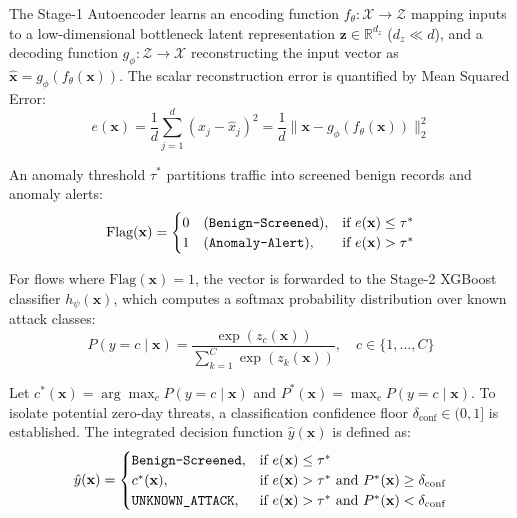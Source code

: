 \documentclass[12pt,a4paper]{report}
\begin{document}
The Stage-1 Autoencoder learns an encoding function $f_\theta: \mathcal{X} \to \mathcal{Z}$ mapping inputs to a low-dimensional bottleneck latent representation $\mathbf{z} \in \mathbb{R}^{d_z}$ ($d_z \ll d$), and a decoding function $g_\phi: \mathcal{Z} \to \mathcal{X}$ reconstructing the input vector as $\hat{\mathbf{x}} = g_\phi(f_\theta(\mathbf{x}))$. The scalar reconstruction error is quantified by Mean Squared Error:
\begin{equation}
e(\mathbf{x}) = \frac{1}{d}\sum_{j=1}^d \left(x_j - \hat{x}_j\right)^2 = \frac{1}{d}\|\mathbf{x} - g_\phi(f_\theta(\mathbf{x}))\|_2^2
\label{eq:ch3_re}
\end{equation}

An anomaly threshold $\tau^*$ partitions traffic into screened benign records and anomaly alerts:
\begin{equation}
\text{Flag}(\mathbf{x}) = \begin{cases}
0 \quad (\text{\texttt{Benign-Screened}}), & \text{if } e(\mathbf{x}) \le \tau^* \\
1 \quad (\text{\texttt{Anomaly-Alert}}), & \text{if } e(\mathbf{x}) > \tau^*
\end{cases}
\label{eq:ch3_gate}
\end{equation}

For flows where $\text{Flag}(\mathbf{x}) = 1$, the vector is forwarded to the Stage-2 XGBoost classifier $h_\psi(\mathbf{x})$, which computes a softmax probability distribution over known attack classes:
\begin{equation}
P(y = c \mid \mathbf{x}) = \frac{\exp(z_c(\mathbf{x}))}{\sum_{k=1}^C \exp(z_k(\mathbf{x}))}, \quad c \in \{1, \dots, C\}
\label{eq:ch3_softmax}
\end{equation}

Let $c^*(\mathbf{x}) = \arg\max_{c} P(y = c \mid \mathbf{x})$ and $P^*(\mathbf{x}) = \max_{c} P(y = c \mid \mathbf{x})$. To isolate potential zero-day threats, a classification confidence floor $\delta_{\text{conf}} \in (0, 1]$ is established. The integrated decision function $\hat{y}(\mathbf{x})$ is defined as:
\begin{equation}
\hat{y}(\mathbf{x}) = \begin{cases}
\text{\texttt{Benign-Screened}}, & \text{if } e(\mathbf{x}) \le \tau^* \\
c^*(\mathbf{x}), & \text{if } e(\mathbf{x}) > \tau^* \text{ and } P^*(\mathbf{x}) \ge \delta_{\text{conf}} \\
\text{\texttt{UNKNOWN\_ATTACK}}, & \text{if } e(\mathbf{x}) > \tau^* \text{ and } P^*(\mathbf{x}) < \delta_{\text{conf}}
\end{cases}
\label{eq:ch3_decision}
\end{equation}
\end{document}
